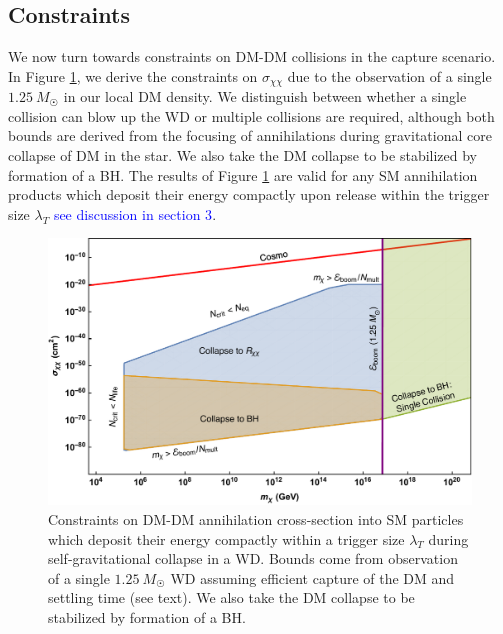 \documentclass[preprintnumbers,amsmath,amssymb,prd,superscriptaddress]{revtex4}
\begin{document}
\subsection{Constraints}
We now turn towards constraints on DM-DM collisions in the capture scenario.
In Figure \ref{fig:multicapture}, we derive the constraints on $\sigma_{\chi \chi}$ due to the observation of a single $1.25 ~ M_{\astrosun}$ in our local DM density. 
We distinguish between whether a single collision can blow up the WD or multiple collisions are required, although both bounds are derived from the focusing of annihilations during gravitational core collapse of DM in the star.
We also take the DM collapse to be stabilized by formation of a BH.
The results of Figure \ref{fig:multicapture} are valid for any SM annihilation products which deposit their energy compactly upon release within the trigger size $\lambda_T$ \textcolor{blue}{see discussion in section 3}. 
\begin{figure}
\includegraphics[scale=.35]{multicollision.pdf}
\caption{Constraints on DM-DM annihilation cross-section into SM particles which deposit their energy compactly within a trigger size $\lambda_T$ during self-gravitational collapse in a WD. Bounds come from observation of a single $1.25~M_{\astrosun}$ WD assuming efficient capture of the DM and settling time (see text). We also take the DM collapse to be stabilized by formation of a BH.}
\label{fig:multicapture}
\end{figure}
\end{document}
